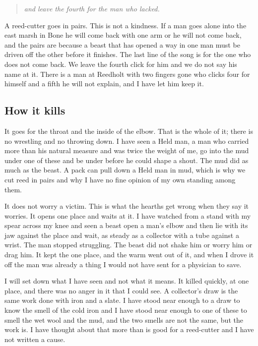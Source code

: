 \documentclass{design/chronicle}
\begin{document}
\begin{quote}\itshape and leave the fourth for the man who lacked.\end{quote}

A reed-cutter goes in pairs. This is not a kindness. If a man goes alone into the east marsh in Bone he will come back with one arm or he will not come back, and the pairs are because a beast that has opened a way in one man must be driven off the other before it finishes. The last line of the song is for the one who does not come back. We leave the fourth click for him and we do not say his name at it. There is a man at Reedholt with two fingers gone who clicks four for himself and a fifth he will not explain, and I have let him keep it.

\subsection*{How it kills}

It goes for the throat and the inside of the elbow. That is the whole of it; there is no wrestling and no throwing down. I have seen a Held man, a man who carried more than his natural measure and was twice the weight of me, go into the mud under one of these and be under before he could shape a shout. The mud did as much as the beast. A pack can pull down a Held man in mud, which is why we cut reed in pairs and why I have no fine opinion of my own standing among them.

It does not worry a victim. This is what the hearths get wrong when they say it worries. It opens one place and waits at it. I have watched from a stand with my spear across my knee and seen a beast open a man’s elbow and then lie with its jaw against the place and wait, as steady as a collector with a tube against a wrist. The man stopped struggling. The beast did not shake him or worry him or drag him. It kept the one place, and the warm went out of it, and when I drove it off the man was already a thing I would not have sent for a physician to save.

I will set down what I have seen and not what it means. It killed quickly, at one place, and there was no anger in it that I could see. A collector’s draw is the same work done with iron and a slate. I have stood near enough to a draw to know the smell of the cold iron and I have stood near enough to one of these to smell the wet wool and the mud, and the two smells are not the same, but the work is. I have thought about that more than is good for a reed-cutter and I have not written a cause.
\end{document}
